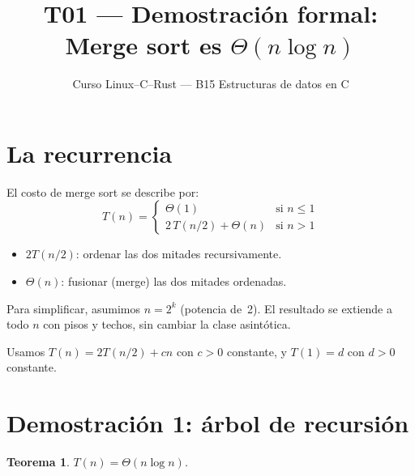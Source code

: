 \documentclass[11pt, letterpaper]{article}
\title{%
  T01 --- Demostración formal:\\[4pt]
  Merge sort es $\Theta(n \log n)$
}
\author{Curso Linux--C--Rust --- B15 Estructuras de datos en C}
\date{}
\theoremstyle{definition}
\theoremstyle{plain}
\newtheorem{theorem}{Teorema}[section]
\theoremstyle{remark}
\begin{document}
\maketitle
\tableofcontents

\section{La recurrencia}

El costo de merge sort se describe por:
\[
  T(n) = \begin{cases}
    \Theta(1) & \text{si } n \leq 1 \\
    2\,T(n/2) + \Theta(n) & \text{si } n > 1
  \end{cases}
\]

\begin{itemize}
  \item $2T(n/2)$: ordenar las dos mitades recursivamente.
  \item $\Theta(n)$: fusionar (merge) las dos mitades ordenadas.
\end{itemize}

Para simplificar, asumimos $n = 2^k$ (potencia de~2). El resultado se
extiende a todo $n$ con pisos y techos, sin cambiar la clase asintótica.

Usamos $T(n) = 2T(n/2) + cn$ con $c > 0$ constante, y $T(1) = d$ con
$d > 0$ constante.

\section{Demostración 1: árbol de recursión}

\begin{theorem}\label{thm:rec-tree}
$T(n) = \Theta(n \log n)$.
\end{theorem}
\end{document}
